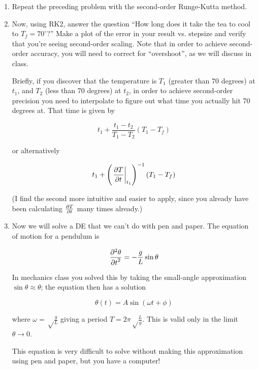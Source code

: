 \documentclass[12pt]{article}
\def\PAR#1#2{ {{\partial #1}\over{\partial #2}} }
\def\PARTWO#1#2{ {{\partial^2 #1}\over{\partial #2}^2} }
\begin{document}
\begin{enumerate}
\item{Repeat the preceding problem with the second-order Runge-Kutta method.}

\item{Now, using RK2, answer the question ``How long does it take the tea to cool to $T_f=70^\circ$?'' Make a plot of the error in your result vs. stepsize and verify that you're seeing second-order scaling. 
Note that in order to achieve second-order accuracy, you will need to correct for ``overshoot'', as we will discuss in class. 

Briefly, if you discover that the temperature is $T_1$ (greater than 70 degrees) at $t_1$, and $T_2$ (less than 70 degrees) at $t_2$, in order to achieve second-order precision you need to interpolate to figure out what time you actually hit 70 degrees at. That time is given by

\begin{equation}
t_1 + \frac{t_1-t_2}{T_1-T_2} (T_1-T_f)
\end{equation}

or alternatively

\begin{equation}
t_1 + \left(\left.\PAR{T}{t}\right|_{t_1}\right)^{-1} (T_1-T_f)
\end{equation}

(I find the second more intuitive and easier to apply, since you already have been calculating $\PAR{T}{t}$ many times already.)

}

\item{Now we will solve a DE that we can't do with pen and paper. The equation of motion for a pendulum is

\begin{equation}
\PARTWO{\theta}{t}=-\frac{g}{L} \sin \theta
\end{equation}

In mechanics class you solved this by taking the small-angle approximation $\sin \theta \approx \theta$; the equation then has a solution

\begin{equation}
\theta(t) = A \sin (\omega t + \phi)
\end{equation}

where $\omega=\sqrt\frac{g}{L}$ giving a period $T=2\pi\sqrt\frac{L}{g}$. This is valid only in the limit $\theta \rightarrow 0$.

This equation is very difficult to solve without making this approximation using pen and paper, but you have a computer! 

}
\end{enumerate}
\end{document}
